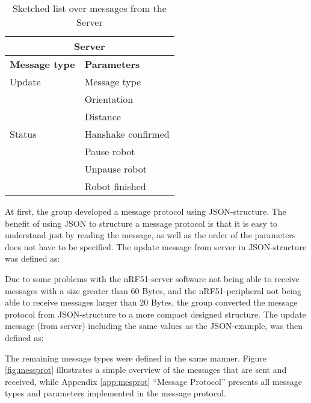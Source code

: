 \begin{table}[ht]
\begin{center}
 \begin{tabular}{|p{60pt} | p{150pt}|} 
 \hline
 \multicolumn{2}{|c|}{\textbf{Server}}\\
 \hline
 \hline
 \textbf{Message type}       &    \textbf{Parameters} \\
 \hline

 Update              &   Message type \\
                    &   Orientation \\
                    &   Distance \\
 \hline
 Status                &   Hanshake confirmed \\
                    &   Pause robot \\
                    &   Unpause robot \\
                    &   Robot finished \\
 \hline
\end{tabular}
\end{center}
\caption{Sketched list over messages from the Server}
\label{tab:messprotfromser}
\end{table}

At first, the group developed a message protocol using JSON-structure. The benefit of using JSON to structure a message protocol is that it is easy to understand just by reading the message, as well as the order of the parameters does not have to be specified. The update message from server in JSON-structure was defined as:


Due to some problems with the nRF51-server software not being able to receive messages with a size greater than 60 Bytes, and the nRF51-peripheral not being able to receive messages larger than 20 Bytes, the group converted the message protocol from JSON-structure to a more compact designed structure. The update message (from server) including the same values as the JSON-example, was then defined as:


The remaining message types were defined in the same manner. Figure \ref{fig:messprot} illustrates a simple overview of the messages that are sent and received, while Appendix \ref{app:mesprot} ``Message Protocol'' presents all message types and parameters implemented in the message protocol.

